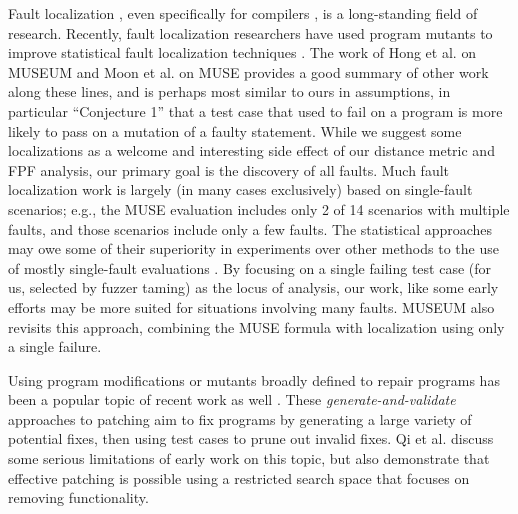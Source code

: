 Fault localization \cite{FaultSurvey,NearNeighbor,Liblit03,Liblit05,Cleve05,Jones2002,Jones05,Jones07,GroceError,ChakiLev,Liu06,SPIN03,Santelices:ICSE:2009,Abreu:2006:PRDC,xuan2014test,DD}, even specifically for compilers \cite{Whalley94}, is a long-standing field of research.  Recently, fault localization researchers have used program mutants to improve statistical \cite{Jones2002} fault localization techniques \cite{MUSE,DebroyMutant,FasterMutant,multilingual,Metallaxis}.
The work of Hong et al. \cite{multilingual} on MUSEUM and Moon et al. \cite{MUSE} on MUSE provides a good summary of other work along these lines, and is perhaps most similar to ours in assumptions, in particular ``Conjecture 1'' that a test case that used to fail on a program is more likely to pass on a mutation of a faulty statement.  While we suggest some localizations as a welcome and interesting side effect of our distance metric and FPF analysis, our primary goal is the discovery of all faults. Much fault localization work is largely (in many cases exclusively) based on single-fault scenarios; e.g., the MUSE \cite{MUSE} evaluation includes only 2 of 14 scenarios with multiple faults, and those scenarios include only a few faults.   The statistical approaches may owe some of their superiority in experiments over other methods to the use of mostly single-fault evaluations \cite{Jones05}.  By focusing on a single failing test case (for us, selected by fuzzer taming) as the locus of analysis, our work, like some early efforts \cite{NearNeighbor,Cleve05,GroceError} may be more suited for situations involving many faults.  MUSEUM \cite{multilingual} also revisits this approach, combining the MUSE formula with localization using only a single failure. 

Using program modifications or mutants broadly defined to repair programs has been a popular topic of recent work as well \cite{GenProg,AutoRep,WeiFix}.  These \emph{generate-and-validate} approaches to patching aim to fix programs by generating a large variety of potential fixes, then using test cases to prune out invalid fixes.  Qi et al. \cite{achour} discuss some serious limitations of early work on this topic, but also demonstrate that effective patching is possible using a restricted search space that focuses on removing functionality.

